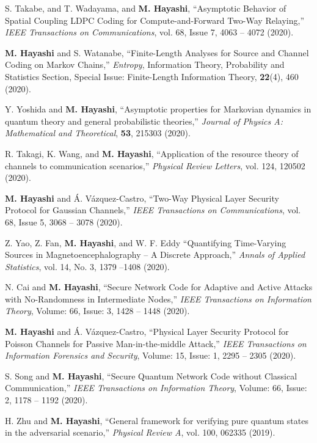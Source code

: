 \documentclass[a4paper,12pt,oneside]{article}
\begin{document}
\begin{enumerate}
S. Takabe, and T. Wadayama, and \textbf{M. Hayashi}, 
``Asymptotic Behavior of Spatial Coupling LDPC Coding for Compute-and-Forward Two-Way Relaying,''
{\em IEEE Transactions on Communications},
vol. 68, Issue 7, 4063 -- 4072 (2020).

\textbf{M. Hayashi} and S. Watanabe,
``Finite-Length Analyses for Source and Channel Coding on Markov Chains,'' 
{\em Entropy}, Information Theory, Probability and Statistics Section, Special Issue: Finite-Length Information Theory,  
{\bf 22}(4), 460 (2020).

Y. Yoshida and \textbf{M. Hayashi},
``Asymptotic properties for Markovian dynamics in quantum theory and general probabilistic theories,'' 
{\em Journal of Physics A: Mathematical and Theoretical}, 
{\bf 53}, 215303 (2020).

R. Takagi, K. Wang, and \textbf{M. Hayashi},
``Application of the resource theory of channels to communication scenarios,'' 
{\em Physical Review Letters}, 
vol. 124, 120502 (2020).

\textbf{M. Hayashi} and \'{A}. V\'{a}zquez-Castro,
``Two-Way Physical Layer Security Protocol for Gaussian Channels,'' 
{\em IEEE Transactions on Communications},
vol. 68, Issue 5, 3068 -- 3078 (2020).

Z. Yao, Z. Fan, \textbf{M. Hayashi}, and W. F. Eddy
``Quantifying Time-Varying Sources in Magnetoencephalography -- A Discrete Approach,''
{\em Annals of Applied Statistics},
vol. 14, No. 3, 1379 --1408 (2020).

N. Cai and \textbf{M. Hayashi},
``Secure Network Code for Adaptive and Active Attacks with No-Randomness in Intermediate Nodes,''
{\em IEEE Transactions on Information Theory}, Volume: 66, Issue: 3, 1428 -- 1448 (2020). 

\textbf{M. Hayashi} and \'{A}. V\'{a}zquez-Castro,
``Physical Layer Security Protocol for Poisson Channels 
for Passive Man-in-the-middle Attack,'' 
{\em IEEE Transactions on Information Forensics and Security},
Volume: 15, Issue: 1, 2295 -- 2305 (2020). 

S. Song and \textbf{M. Hayashi},
``Secure Quantum Network Code without Classical Communication,''
{\em IEEE Transactions on Information Theory}, 
Volume: 66, Issue: 2, 1178 -- 1192 (2020). 

H. Zhu and \textbf{M. Hayashi},
``General framework for verifying pure quantum states in the adversarial scenario,''
{\em Physical Review A}, 
vol. 100, 062335 (2019).
 

\end{enumerate}
\end{document}
